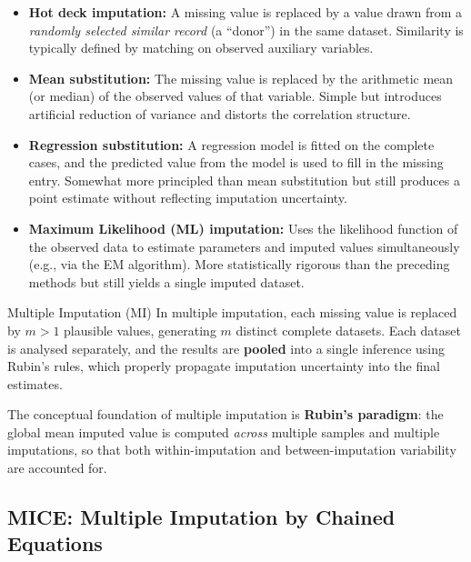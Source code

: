 \documentclass[11pt]{article}
\theoremstyle{smallexample}
\begin{document}
 \begin{itemize}
  \item \textbf{Hot deck imputation:} A missing value is replaced by a value drawn
    from a \emph{randomly selected similar record} (a ``donor'') in the same dataset.
    Similarity is typically defined by matching on observed auxiliary variables.

  \vspace{0.2cm}
  \item \textbf{Mean substitution:} The missing value is replaced by the arithmetic
    mean (or median) of the observed values of that variable. Simple but introduces
    artificial reduction of variance and distorts the correlation structure.

  \vspace{0.2cm}
  \item \textbf{Regression substitution:} A regression model is fitted on the
    complete cases, and the predicted value from the model is used to fill in the
    missing entry. Somewhat more principled than mean substitution but still produces
    a point estimate without reflecting imputation uncertainty.

  \vspace{0.2cm}
  \item \textbf{Maximum Likelihood (ML) imputation:} Uses the likelihood function
    of the observed data to estimate parameters and imputed values simultaneously
    (e.g., via the EM algorithm). More statistically rigorous than the preceding
    methods but still yields a single imputed dataset.
 \end{itemize}

 \begin{defbox}{Multiple Imputation (MI)}
  In multiple imputation, each missing value is replaced by \textbf{$m > 1$}
  plausible values, generating $m$ distinct complete datasets. Each dataset is
  analysed separately, and the results are \textbf{pooled} into a single inference
  using Rubin's rules, which properly propagate imputation uncertainty into the
  final estimates.
 \end{defbox}

The conceptual foundation of multiple imputation is \textbf{Rubin's paradigm}: the
global mean imputed value is computed \emph{across} multiple samples and multiple
imputations, so that both within-imputation and between-imputation variability are
accounted for.

\subsection{MICE: Multiple Imputation by Chained Equations}
\end{document}
